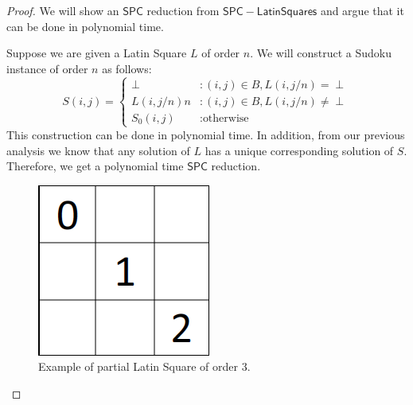 \documentclass[runningheads,a4paper]{llncs}
\begin{document}
\begin{proof} 

We will show an $\mathsf{SPC}$ reduction from $\mathsf{SPC-Latin Squares}$ and argue that it can be done in polynomial time.

Suppose we are given a Latin Square $L$ of order $n$. We will construct a Sudoku instance of order $n$ as follows:
\begin{displaymath}
S(i,j) = \left\{
\begin{array}{lr}
\perp & : (i,j) \in B, L(i, j/n) = \perp \\
L(i, j/n) n & : (i,j) \in B, L(i, j/n) \neq \perp \\
S_0 (i,j) & : \text{otherwise}
\end{array}
\right.
\end{displaymath}
This construction can be done in polynomial time. In addition, from our previous analysis we know that any solution of $L$ has a unique corresponding solution of $S$. Therefore, we get a polynomial time $\mathsf{SPC}$ reduction.

\begin{figure}[H]
\label{fig:partialLS}
\centering
\includegraphics[scale=0.25]{sudoku-3.png}
\caption{Example of partial Latin Square of order 3.}
\end{figure}


\end{proof}
\end{document}
